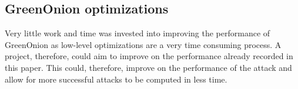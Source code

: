 \subsection*{GreenOnion optimizations}
Very little work and time was invested into improving the performance of GreenOnion as low-level optimizations are a very time consuming process. A project, therefore, could aim to improve on the performance already recorded in this paper. This could, therefore, improve on the performance of the attack and allow for more successful attacks to be computed in less time. 